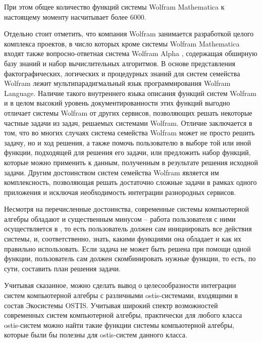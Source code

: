 При этом общее количество функций системы Wolfram Mathematica к настоящему моменту насчитывает более 6000.

Отдельно стоит отметить, что компания Wolfram занимается разработкой целого комплекса проектов, в число которых кроме системы Wolfram Mathematica входят также вопросно-ответная система Wolfram Alpha \cite{WolframAlpha}, содержащая обширную базу знаний и набор вычислительных алгоритмов. В основе представления фактографических, логических и процедурных знаний для систем семейства Wolfram лежит мультипарадигмальный язык программирования Wolfram Language. Наличие такого внутреннего языка описания функций систем Wolfram и в целом высокий уровень документированности этих функций выгодно отличает системы Wolfram от других сервисов, позволяющих решать некоторые частные задачи из задач, решаемых системами Wolfram.  Отличие заключается в том, что во многих случаях система семейства Wolfram может не просто решить задачу, но и  ход решения, а также помочь пользователю в выборе той или иной функции, подходящей для решения его задачи, или предложить набор функций, которые можно применить к данным, полученным в результате решения исходной задачи. Другим достоинством систем семейства Wolfram является им комплексность, позволяющая решать достаточно сложные задачи в рамках одного приложения и исключая необходимость интеграции разнородных сервисов.

Несмотря на перечисленные достоинства, современные системы компьютерной алгебры обладают и существенным минусом -- работа пользователя с ними осуществляется в , то есть пользователь должен сам инициировать все действия системы, и, соответственно, знать, какими функциями она обладает и как их правильно использовать. Если задача не может быть решена при помощи одной функции, пользователь сам должен скомбинировать нужные функции, то есть, по сути, составить план решения задачи.

Учитывая сказанное, можно сделать вывод о целесообразности интеграции систем компьютерной алгебры с различными ostis-системами, входящими в состав Экосистемы OSTIS. Учитывая широкий спектр возможностей современных систем компьютерной алгебры, практически для любого класса ostis-систем можно найти такие функции системы компьютерной алгебры, которые были бы полезны для ostis-систем данного класса. 

